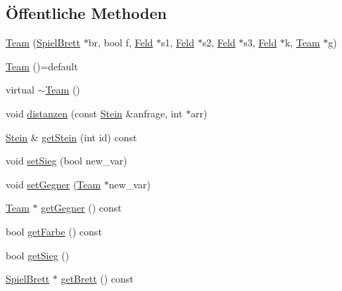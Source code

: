 \subsection*{Öffentliche Methoden}
\begin{DoxyCompactItemize}
\item 
\hyperlink{class_team_ac246630434b2154b18d7538f3886f89d}{Team} (\hyperlink{class_spiel_brett}{Spiel\+Brett} $\ast$br, bool f, \hyperlink{class_feld}{Feld} $\ast$s1, \hyperlink{class_feld}{Feld} $\ast$s2, \hyperlink{class_feld}{Feld} $\ast$s3, \hyperlink{class_feld}{Feld} $\ast$k, \hyperlink{class_team}{Team} $\ast$g)
\item 
\hyperlink{class_team_af4b0ef286d67546ce8208aeceb4f576a}{Team} ()=default
\item 
virtual \hyperlink{class_team_ab4218fddd612d52bab47bec4feeb49de}{$\sim$\+Team} ()
\item 
void \hyperlink{class_team_aca8bdbcf6d3fd6e4efbe84fc158089b1}{distanzen} (const \hyperlink{class_stein}{Stein} \&anfrage, int $\ast$arr)
\item 
\hyperlink{class_stein}{Stein} \& \hyperlink{class_team_a458bc7ccfe8325b848723774a9564729}{get\+Stein} (int id) const 
\item 
void \hyperlink{class_team_a118a601e0db3871796a6c5be8ef7883d}{set\+Sieg} (bool new\+\_\+var)
\item 
void \hyperlink{class_team_a57428fa9c4911a089cd317e71f2018ab}{set\+Gegner} (\hyperlink{class_team}{Team} $\ast$new\+\_\+var)
\item 
\hyperlink{class_team}{Team} $\ast$ \hyperlink{class_team_a4342344f18da4e843ff8bf08525628ec}{get\+Gegner} () const 
\item 
bool \hyperlink{class_team_adabf037f25d619ba30f6d19a9fd5c888}{get\+Farbe} () const 
\item 
bool \hyperlink{class_team_a8d92a4f530838898bb9ca43a7da3ff8d}{get\+Sieg} ()
\item 
\hyperlink{class_spiel_brett}{Spiel\+Brett} $\ast$ \hyperlink{class_team_abd4d61dc0590e55c906f22bfd49b4eb7}{get\+Brett} () const 
\end{DoxyCompactItemize}
